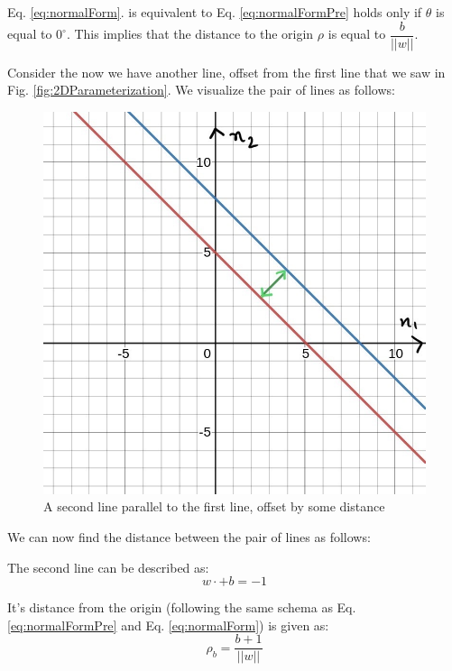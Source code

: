 \documentclass[11pt]{article}
\begin{document}
Eq. \ref{eq:normalForm}. is equivalent to Eq. \ref{eq:normalFormPre} holds only if $\theta$ is equal to $0^\circ$. This implies that the distance to the origin $\rho$ is equal to $\dfrac{b}{||w||}$.

Consider the now we have another line, offset from the first line that we saw in Fig. \ref{fig:2DParameterization}. We visualize the pair of lines as follows:

\begin{figure}[h]
    \centering
    \includegraphics[scale = 0.30]{figures/lineDistance.jpg}
    \caption{A second line parallel to the first line, offset by some distance}
    \label{fig:22DLines}
\end{figure}

We can now find the distance between the pair of lines as follows:

The second line can be described as:
\begin{equation}
    w \cdot + b = - 1
\end{equation}

It's distance from the origin (following the same schema as Eq. \ref{eq:normalFormPre} and Eq. \ref{eq:normalForm}) is given as:
\begin{equation}
    \rho_b = \dfrac{b + 1}{||w||}
\end{equation}
\end{document}
